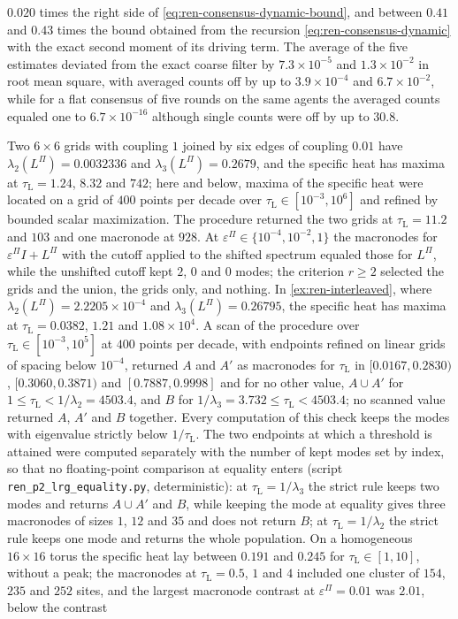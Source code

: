 \begin{numcheck}
$0.020$ times the right side of \eqref{eq:ren-consensus-dynamic-bound}, and between $0.41$ and $0.43$ times the bound obtained from the recursion \eqref{eq:ren-consensus-dynamic} with the exact second moment of its driving term. The average of the five estimates deviated from the exact coarse filter by $7.3\times10^{-5}$ and $1.3\times10^{-2}$ in root mean square, with averaged counts off by up to $3.9\times10^{-4}$ and $6.7\times10^{-2}$, while for a flat consensus of five rounds on the same agents the averaged counts equaled one to $6.7\times10^{-16}$ although single counts were off by up to $30.8$.
\end{numcheck}

\begin{numcheck}\label{chk:ren-lrg}
Two $6\times6$ grids with coupling $1$ joined by six edges of coupling $0.01$ have $\lambda_2(L^\Pi)=0.0032336$ and $\lambda_3(L^\Pi)=0.2679$, and the specific heat has maxima at $\tau_{\mathrm L}=1.24$, $8.32$ and $742$; here and below, maxima of the specific heat were located on a grid of $400$ points per decade over $\tau_{\mathrm L}\in[10^{-3},10^6]$ and refined by bounded scalar maximization. The procedure returned the two grids at $\tau_{\mathrm L}=11.2$ and $103$ and one macronode at $928$. At $\varepsilon^\Pi\in\{10^{-4},10^{-2},1\}$ the macronodes for $\varepsilon^\Pi I+L^\Pi$ with the cutoff applied to the shifted spectrum equaled those for $L^\Pi$, while the unshifted cutoff kept $2$, $0$ and $0$ modes; the criterion $r\ge2$ selected the grids and the union, the grids only, and nothing. In \cref{ex:ren-interleaved}, where $\lambda_2(L^\Pi)=2.2205\times10^{-4}$ and $\lambda_3(L^\Pi)=0.26795$, the specific heat has maxima at $\tau_{\mathrm L}=0.0382$, $1.21$ and $1.08\times10^4$. A scan of the procedure over $\tau_{\mathrm L}\in[10^{-3},10^5]$ at $400$ points per decade, with endpoints refined on linear grids of spacing below $10^{-4}$, returned $A$ and $A'$ as macronodes for $\tau_{\mathrm L}$ in $[0.0167,0.2830)$, $[0.3060,0.3871)$ and $[0.7887,0.9998]$ and for no other value, $A\cup A'$ for $1\le\tau_{\mathrm L}<1/\lambda_2=4503.4$, and $B$ for $1/\lambda_3=3.732\le\tau_{\mathrm L}<4503.4$; no scanned value returned $A$, $A'$ and $B$ together. Every computation of this check keeps the modes with eigenvalue strictly below $1/\tau_{\mathrm L}$. The two endpoints at which a threshold is attained were computed separately with the number of kept modes set by index, so that no floating-point comparison at equality enters (script \texttt{ren\_p2\_lrg\_equality.py}, deterministic): at $\tau_{\mathrm L}=1/\lambda_3$ the strict rule keeps two modes and returns $A\cup A'$ and $B$, while keeping the mode at equality gives three macronodes of sizes $1$, $12$ and $35$ and does not return $B$; at $\tau_{\mathrm L}=1/\lambda_2$ the strict rule keeps one mode and returns the whole population. On a homogeneous $16\times16$ torus the specific heat lay between $0.191$ and $0.245$ for $\tau_{\mathrm L}\in[1,10]$, without a peak; the macronodes at $\tau_{\mathrm L}=0.5$, $1$ and $4$ included one cluster of $154$, $235$ and $252$ sites, and the largest macronode contrast at $\varepsilon^\Pi=0.01$ was $2.01$, below the contrast 
\end{numcheck}
